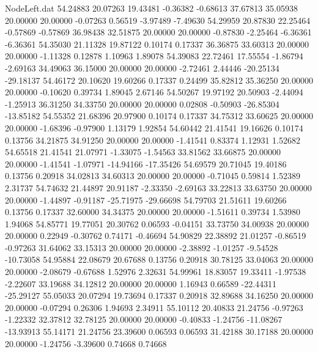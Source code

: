\begin{filecontents}{NodeLeft.dat}
  54.24883   20.07263   19.43481    -0.36382   -0.68613   37.67813   35.05938   20.00000   20.00000   -0.07263    0.56519   -3.97489   -7.49630
  54.29959   20.87830   22.25464    -0.57869   -0.57869   36.98438   32.51875   20.00000   20.00000   -0.87830   -2.25464   -6.36361   -6.36361
  54.35030   21.11328   19.87122     0.10174    0.17337   36.36875   33.60313   20.00000   20.00000   -1.11328    0.12878    1.10963    1.89078
  54.39083   22.72461   17.55554    -1.86794   -2.69163   34.49063   36.15000   20.00000   20.00000   -2.72461    2.44446  -20.25134  -29.18137
  54.46172   20.10620   19.60266     0.17337    0.24499   35.82812   35.36250   20.00000   20.00000   -0.10620    0.39734    1.89045    2.67146
  54.50267   19.97192   20.50903    -2.44094   -1.25913   36.31250   34.33750   20.00000   20.00000    0.02808   -0.50903  -26.85304  -13.85182
  54.55352   21.68396   20.97900     0.10174    0.17337   34.75312   33.60625   20.00000   20.00000   -1.68396   -0.97900    1.13179    1.92854
  54.60442   21.41541   19.16626     0.10174    0.13756   34.21875   34.91250   20.00000   20.00000   -1.41541    0.83374    1.12931    1.52682
  54.65518   21.41541   21.07971    -1.33075   -1.54563   33.81562   33.66875   20.00000   20.00000   -1.41541   -1.07971  -14.94166  -17.35426
  54.69579   20.71045   19.40186     0.13756    0.20918   34.02813   34.60313   20.00000   20.00000   -0.71045    0.59814    1.52389    2.31737
  54.74632   21.44897   20.91187    -2.33350   -2.69163   33.22813   33.63750   20.00000   20.00000   -1.44897   -0.91187  -25.71975  -29.66698
  54.79703   21.51611   19.60266     0.13756    0.17337   32.60000   34.34375   20.00000   20.00000   -1.51611    0.39734    1.53980    1.94068
  54.85771   19.77051   20.30762     0.06593   -0.04151   33.73750   34.00938   20.00000   20.00000    0.22949   -0.30762    0.74171   -0.46694
  54.90829   22.38892   21.01257    -0.86519   -0.97263   31.64062   33.15313   20.00000   20.00000   -2.38892   -1.01257   -9.54528  -10.73058
  54.95884   22.08679   20.67688     0.13756    0.20918   30.78125   33.04063   20.00000   20.00000   -2.08679   -0.67688    1.52976    2.32631
  54.99961   18.83057   19.33411    -1.97538   -2.22607   33.19688   34.12812   20.00000   20.00000    1.16943    0.66589  -22.44311  -25.29127
  55.05033   20.07294   19.73694     0.17337    0.20918   32.89688   34.16250   20.00000   20.00000   -0.07294    0.26306    1.94693    2.34911
  55.10112   20.40833   21.24756    -0.97263   -1.22332   32.37812   32.78125   20.00000   20.00000   -0.40833   -1.24756  -11.08267  -13.93913
  55.14171   21.24756   23.39600     0.06593    0.06593   31.42188   30.17188   20.00000   20.00000   -1.24756   -3.39600    0.74668    0.74668

\end{filecontents}
